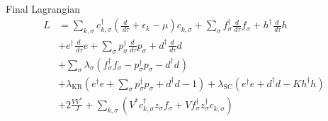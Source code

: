 \documentclass[13pt]{beamer}
\begin{document}
  \begin{frame}{Final Lagrangian}
    \begin{equation}
    \begin{align*}
    L &= \sum_{k,\sigma} c^{\dagger}_{k,\sigma} \left( \frac{d}{\,d\tau} + \epsilon_k - \mu \right) c^{}_{k,\sigma} + \sum_{\sigma} f^{\dagger}_{\sigma} \frac{d}{\,d\tau} f^{}_{\sigma} + h^{\dagger} \frac{d}{\,d\tau}h \\
    &+ e^{\dagger} \frac{d}{\,d\tau} e  + \sum_{\sigma} p^{\dagger}_{\sigma} \frac{d}{\,d\tau} p^{}_{\sigma} + d^{\dagger} \frac{d}{\,d\tau} d \\
    &+ \sum_{\sigma} \lambda^{}_{\sigma} (f^{\dagger}_{\sigma} f^{}_{\sigma} - p^{\dagger}_{\sigma} p^{}_{\sigma} - d^{\dagger} d^{} ) \\
    &+ \lambda_{\text{KR}} ( e^{\dagger} e + \sum_{\sigma} p^{\dagger}_{\sigma} p^{}_{\sigma} + d^{\dagger} d - 1 ) + \lambda_{\text{SC}} ( e^{\dagger} e + d^{\dagger} d - K h^{\dagger} h) \\
    &+ 2 \frac{V V^{\ast}}{J} + \sum_{k,\sigma} \left( V^{\ast} c^{\dagger}_{k,\sigma} z^{}_{\sigma} f^{}_{\sigma} + V f^{\dagger}_{\sigma} z^{\dagger}_{\sigma} c^{}_{k,\sigma} \right)
    \end{align*}
    \end{equation}
  \end{frame}
\end{document}
